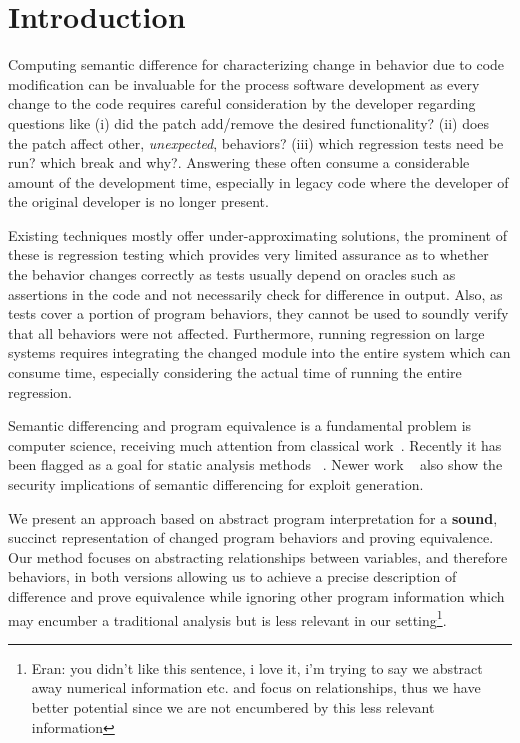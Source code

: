 \section{Introduction} 



Computing semantic difference for characterizing change in behavior due to code modification can be invaluable for the process software development as every change to the code requires careful consideration by the developer regarding questions like (i) did the patch add/remove the desired functionality? (ii) does the patch affect other, \emph{unexpected}, behaviors? (iii) which regression tests need be run? which break and why?. Answering these often consume a considerable amount of the development time, especially in legacy code where the developer of the original developer is no longer present.

Existing techniques mostly offer under-approximating solutions, the prominent of these is regression testing which provides very limited assurance as to whether the behavior changes correctly as tests usually depend on oracles such as assertions in the code and not necessarily check for difference in output. Also, as tests cover a portion of program behaviors, they cannot be used to soundly verify that all behaviors were not affected. Furthermore, running regression on large systems requires integrating the changed module into the entire system which can consume time, especially considering the actual time of running the entire regression.

Semantic differencing and program equivalence is a fundamental problem is computer science, receiving much attention from classical work~\cite{}. Recently it has been flagged as a goal for static analysis methods ~\cite{}. Newer work ~\cite{} also show the security implications of semantic differencing for exploit generation.

We present an approach based on abstract program interpretation for a \textbf{sound}, succinct representation of changed program behaviors and proving equivalence. Our method focuses on abstracting relationships between variables, and therefore behaviors, in both versions allowing us to achieve a precise description of difference and prove equivalence while ignoring other program information which may encumber a traditional analysis but is less relevant in our setting\footnote[1]{Eran: you didn't like this sentence, i love it, i'm trying to say we abstract away numerical information etc. and focus on relationships, thus we have better potential since we are not encumbered by this less relevant information}.

